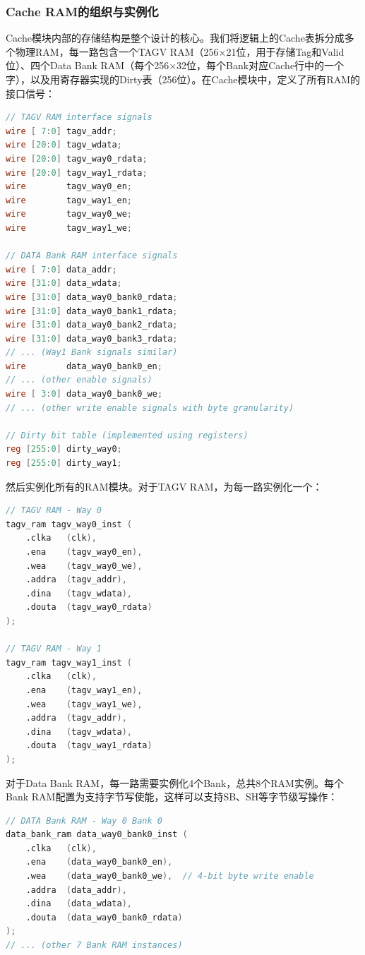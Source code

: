 \documentclass[11pt]{article}
\begin{document}
\subsubsection{Cache RAM的组织与实例化}

Cache模块内部的存储结构是整个设计的核心。我们将逻辑上的Cache表拆分成多个物理RAM，每一路包含一个TAGV RAM（256×21位，用于存储Tag和Valid位）、四个Data Bank RAM（每个256×32位，每个Bank对应Cache行中的一个字），以及用寄存器实现的Dirty表（256位）。在Cache模块中，定义了所有RAM的接口信号：

\begin{lstlisting}[language=Verilog]
// TAGV RAM interface signals
wire [ 7:0] tagv_addr;
wire [20:0] tagv_wdata;
wire [20:0] tagv_way0_rdata;
wire [20:0] tagv_way1_rdata;
wire        tagv_way0_en;
wire        tagv_way1_en;
wire        tagv_way0_we;
wire        tagv_way1_we;

// DATA Bank RAM interface signals
wire [ 7:0] data_addr;
wire [31:0] data_wdata;
wire [31:0] data_way0_bank0_rdata;
wire [31:0] data_way0_bank1_rdata;
wire [31:0] data_way0_bank2_rdata;
wire [31:0] data_way0_bank3_rdata;
// ... (Way1 Bank signals similar)
wire        data_way0_bank0_en;
// ... (other enable signals)
wire [ 3:0] data_way0_bank0_we;
// ... (other write enable signals with byte granularity)

// Dirty bit table (implemented using registers)
reg [255:0] dirty_way0;
reg [255:0] dirty_way1;
\end{lstlisting}

然后实例化所有的RAM模块。对于TAGV RAM，为每一路实例化一个：

\begin{lstlisting}[language=Verilog]
// TAGV RAM - Way 0
tagv_ram tagv_way0_inst (
    .clka   (clk),
    .ena    (tagv_way0_en),
    .wea    (tagv_way0_we),
    .addra  (tagv_addr),
    .dina   (tagv_wdata),
    .douta  (tagv_way0_rdata)
);

// TAGV RAM - Way 1
tagv_ram tagv_way1_inst (
    .clka   (clk),
    .ena    (tagv_way1_en),
    .wea    (tagv_way1_we),
    .addra  (tagv_addr),
    .dina   (tagv_wdata),
    .douta  (tagv_way1_rdata)
);
\end{lstlisting}

对于Data Bank RAM，每一路需要实例化4个Bank，总共8个RAM实例。每个Bank RAM配置为支持字节写使能，这样可以支持SB、SH等字节级写操作：

\begin{lstlisting}[language=Verilog]
// DATA Bank RAM - Way 0 Bank 0
data_bank_ram data_way0_bank0_inst (
    .clka   (clk),
    .ena    (data_way0_bank0_en),
    .wea    (data_way0_bank0_we),  // 4-bit byte write enable
    .addra  (data_addr),
    .dina   (data_wdata),
    .douta  (data_way0_bank0_rdata)
);
// ... (other 7 Bank RAM instances)
\end{lstlisting}
\end{document}
